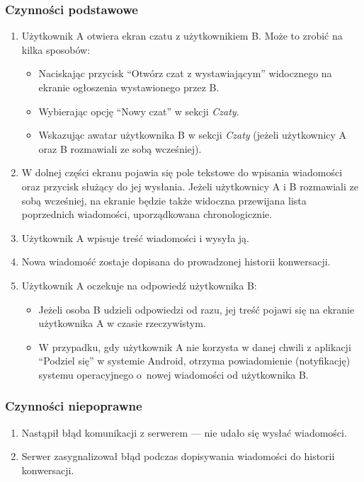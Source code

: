\documentclass[licencjacka]{pracamgr}
\begin{document}
    \subsubsection{Czynności podstawowe}
    \begin{enumerate}
        \item Użytkownik A otwiera ekran czatu z użytkownikiem B. Może to zrobić na kilka sposobów:
        \begin{itemize}
            \item Naciskając przycisk ``Otwórz czat z wystawiającym'' widocznego na ekranie ogłoszenia wystawionego przez B.
            \item Wybierając opcję ``Nowy czat'' w sekcji \textit{Czaty}.
            \item Wskazując awatar użytkownika B w sekcji \textit{Czaty} (jeżeli użytkownicy A oraz B rozmawiali ze sobą wcześniej).
        \end{itemize}
        \item W dolnej części ekranu pojawia się pole tekstowe do wpisania wiadomości oraz przycisk służący do jej wysłania. Jeżeli użytkownicy A i B rozmawiali ze sobą wcześniej, na ekranie będzie także widoczna przewijana lista poprzednich wiadomości, uporządkowana chronologicznie.
        \item Użytkownik A wpisuje treść wiadomości i wysyła ją.
        \item Nowa wiadomość zostaje dopisana do prowadzonej historii konwersacji.
        \item Użytkownik A oczekuje na odpowiedź użytkownika B:\@
        \begin{itemize}
            \item Jeżeli osoba B udzieli odpowiedzi od razu, jej treść pojawi się na ekranie użytkownika A w czasie rzeczywistym.
            \item W przypadku, gdy użytkownik A nie korzysta w danej chwili z aplikacji ``Podziel się'' w systemie Android, otrzyma powiadomienie (notyfikację) systemu operacyjnego o~nowej wiadomości od użytkownika B.
        \end{itemize}
    \end{enumerate}
    \subsubsection{Czynności niepoprawne}
    \begin{enumerate}
        \item Nastąpił błąd komunikacji z serwerem --- nie udało się wysłać wiadomości.
        \item Serwer zasygnalizował błąd podczas dopisywania wiadomości do historii konwersacji.
    \end{enumerate}
\end{document}
